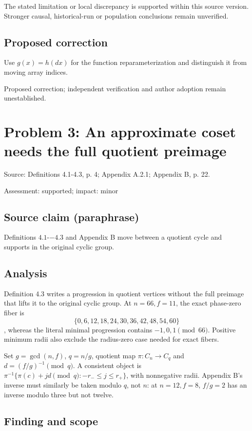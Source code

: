 \documentclass[11pt]{article}
\begin{document}
The stated limitation or local discrepancy is supported within this source version. Stronger causal, historical-run or population conclusions remain unverified.

\subsection*{Proposed correction}

Use \(g(x)=h(dx)\) for the function reparameterization and distinguish it from moving array indices.

Proposed correction; independent verification and author adoption remain unestablished.

\section*{Problem 3: An approximate coset needs the full quotient preimage}

Source: Definitions 4.1-4.3, p. 4; Appendix A.2.1; Appendix B, p. 22.

Assessment: supported; impact: minor

\subsection*{Source claim (paraphrase)}

Definitions \(4.1\)-\(-4.3\) and Appendix B move between a quotient cycle and supports in the original cyclic group.

\subsection*{Analysis}

Definition 4.3 writes a progression in quotient vertices without the full preimage that lifts it to the original cyclic group. At \(n=66,f=11\), the exact phase-zero fiber is \[\{0,6,12,18,24,30,36,42,48,54,60\}\], whereas the literal minimal progression contains \(-1,0,1\pmod{66}\). Positive minimum radii also exclude the radius-zero case needed for exact fibers.

Set \(g=\gcd(n,f)\), \(q=n/g\), quotient map \(\pi:C_n\to C_q\) and \(d=(f/g)^{-1}\pmod q\). A consistent object is \(\pi^{-1}\{\pi(c)+jd\pmod q:-r_-\le j\le r_+\}\), with nonnegative radii. Appendix B's inverse must similarly be taken modulo \(q\), not \(n\): at \(n=12,f=8\), \(f/g=2\) has an inverse modulo three but not twelve.

\subsection*{Finding and scope}
\end{document}
